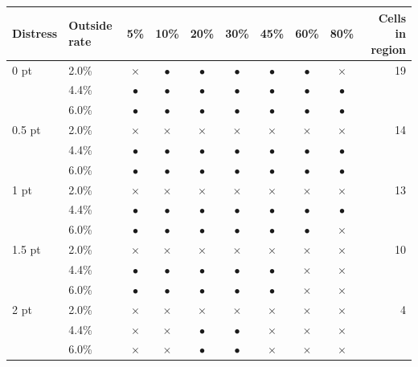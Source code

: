 \begin{tabular}{llcccccccr}
\toprule
Distress & Outside rate & 5\% & 10\% & 20\% & 30\% & 45\% & 60\% & 80\% & Cells in region \\
\midrule
0 pt & 2.0\% & $\times$ & $\bullet$ & $\bullet$ & $\bullet$ & $\bullet$ & $\bullet$ & $\times$ & 19 \\
 & 4.4\% & $\bullet$ & $\bullet$ & $\bullet$ & $\bullet$ & $\bullet$ & $\bullet$ & $\bullet$ &  \\
 & 6.0\% & $\bullet$ & $\bullet$ & $\bullet$ & $\bullet$ & $\bullet$ & $\bullet$ & $\bullet$ &  \\
0.5 pt & 2.0\% & $\times$ & $\times$ & $\times$ & $\times$ & $\times$ & $\times$ & $\times$ & 14 \\
 & 4.4\% & $\bullet$ & $\bullet$ & $\bullet$ & $\bullet$ & $\bullet$ & $\bullet$ & $\bullet$ &  \\
 & 6.0\% & $\bullet$ & $\bullet$ & $\bullet$ & $\bullet$ & $\bullet$ & $\bullet$ & $\bullet$ &  \\
1 pt & 2.0\% & $\times$ & $\times$ & $\times$ & $\times$ & $\times$ & $\times$ & $\times$ & 13 \\
 & 4.4\% & $\bullet$ & $\bullet$ & $\bullet$ & $\bullet$ & $\bullet$ & $\bullet$ & $\bullet$ &  \\
 & 6.0\% & $\bullet$ & $\bullet$ & $\bullet$ & $\bullet$ & $\bullet$ & $\bullet$ & $\times$ &  \\
1.5 pt & 2.0\% & $\times$ & $\times$ & $\times$ & $\times$ & $\times$ & $\times$ & $\times$ & 10 \\
 & 4.4\% & $\bullet$ & $\bullet$ & $\bullet$ & $\bullet$ & $\bullet$ & $\times$ & $\times$ &  \\
 & 6.0\% & $\bullet$ & $\bullet$ & $\bullet$ & $\bullet$ & $\bullet$ & $\times$ & $\times$ &  \\
2 pt & 2.0\% & $\times$ & $\times$ & $\times$ & $\times$ & $\times$ & $\times$ & $\times$ & 4 \\
 & 4.4\% & $\times$ & $\times$ & $\bullet$ & $\bullet$ & $\times$ & $\times$ & $\times$ &  \\
 & 6.0\% & $\times$ & $\times$ & $\bullet$ & $\bullet$ & $\times$ & $\times$ & $\times$ &  \\
\bottomrule
\end{tabular}
